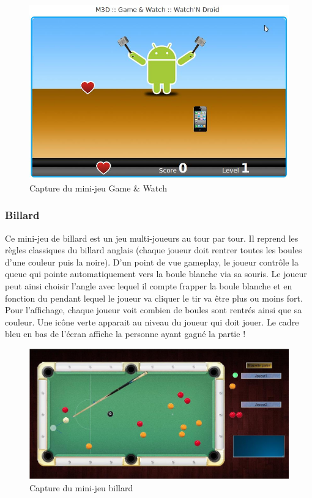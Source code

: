 \begin{figure}
 \includegraphics[width=\linewidth]{img/capturejeu_watchndroid}
 \caption{Capture du mini-jeu Game \& Watch}
 \label{fig:game_gamewatch}
\end{figure}

\subsubsection{Billard}

Ce mini-jeu de billard est un jeu multi-joueurs au tour par tour. 
Il reprend les règles classiques du billard anglais (chaque joueur doit rentrer toutes les boules d’une couleur puis la noire). 
D’un point de vue gameplay, le joueur contrôle la queue qui pointe automatiquement vers la boule blanche via sa souris. 
Le joueur peut ainsi choisir l’angle avec lequel il compte frapper la boule blanche et en fonction du pendant lequel le joueur va cliquer le tir va être plus ou moins fort. 
Pour l’affichage, chaque joueur voit combien de boules sont rentrés ainsi que sa couleur. Une icône verte apparait au niveau du joueur qui doit jouer. 
Le cadre bleu en bas de l’écran affiche la personne ayant gagné la partie !

\begin{figure}
 \includegraphics[width=\linewidth]{img/capturejeu_billard}
 \caption{Capture du mini-jeu billard}
 \label{fig:game_billard}
\end{figure}

